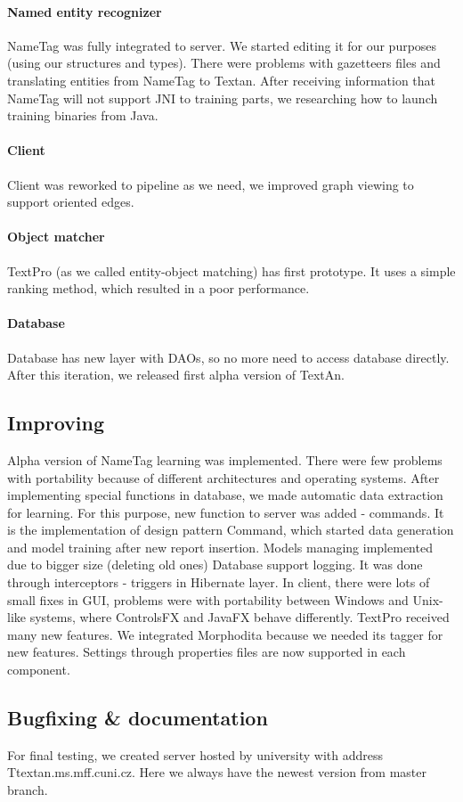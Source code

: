 \paragraph{Named entity recognizer} NameTag was fully integrated to server. We started editing it for our purposes (using our structures and types). There were problems with gazetteers files and translating entities from NameTag to Textan.
After receiving information that NameTag will not support JNI to training parts, we researching how to launch training binaries from Java.
\paragraph{Client} Client was reworked to pipeline as we need, we improved graph viewing to support oriented edges.
\paragraph{Object matcher} TextPro (as we called entity-object matching) has first prototype. It uses a simple ranking method, which resulted in a poor performance. 
\paragraph{Database} Database has new layer with DAOs, so no more need to access database directly.
After this iteration, we released first alpha version of TextAn.

\subsection{Improving}
Alpha version of NameTag learning was implemented. There were few problems with portability because of different architectures and operating systems. After implementing special functions in database, we made automatic data extraction for learning. For this purpose, new function to server was added - commands. It is the implementation of design pattern Command, which started data generation and model training after new report insertion. Models managing implemented due to bigger size (deleting old ones) 
Database support logging. It was done through interceptors - triggers in Hibernate layer.
In client, there were lots of small fixes in GUI, problems were with portability between Windows and Unix-like systems, where ControlsFX and JavaFX behave differently.
TextPro received many new features. We integrated Morphodita because we needed its tagger for new features.
Settings through properties files are now supported in each component.

\subsection{Bugfixing \& documentation}
For final testing, we created server hosted by university with address Ttextan.ms.mff.cuni.cz. Here we always have the newest version from master branch.
